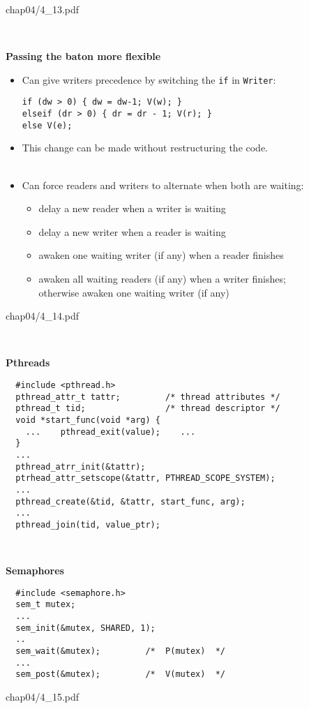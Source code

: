 \documentclass{article}
\newcommand{\myfig}[1]{\begin{overpic}[scale=1.5]{#1}}
\newcommand{\myfigsmall}[1]{\begin{overpic}[scale=1.15]{#1}}
\newcommand{\myfigtiny}[1]{\begin{overpic}[scale=1.0]{#1}}
\newcommand{\myfigend}{\end{overpic}\newpage}
\newcommand{\bi}{\begin{itemize}}
\newcommand{\ii}{\item}
\newcommand{\ei}{\end{itemize}}
\newcommand{\ti}[1]{
\mbox{~}

\vspace{1.25in}
\centerline{\bf #1}}
\begin{document}
\myfigsmall{chap04/4_13.pdf}
\myfigend

\ti{Passing the baton more flexible}
\bi
\ii Can give writers precedence by switching the {\tt if} in {\tt Writer}:
\begin{Verbatim}
if (dw > 0) { dw = dw-1; V(w); }
elseif (dr > 0) { dr = dr - 1; V(r); }
else V(e);
\end{Verbatim}
\ii This change can be made without restructuring the code.
\\\\
\ii Can force readers and writers to alternate when both are waiting:
\bi
\ii delay a new reader when a writer is waiting
\ii delay a new writer when a reader is waiting
\ii awaken one waiting writer (if any) when a reader finishes
\ii awaken all waiting readers (if any) when a writer finishes;\\
 otherwise awaken one waiting writer (if any)
\ei
\ei
\newpage

\myfig{chap04/4_14.pdf}
\myfigend

\ti{Pthreads}

\begin{verbatim}
  #include <pthread.h>
  pthread_attr_t tattr;         /* thread attributes */
  pthread_t tid;                /* thread descriptor */
  void *start_func(void *arg) {
    ...    pthread_exit(value);    ...
  }
  ...
  pthread_atrr_init(&tattr);
  ptrhead_attr_setscope(&tattr, PTHREAD_SCOPE_SYSTEM);
  ...
  pthread_create(&tid, &tattr, start_func, arg);
  ...
  pthread_join(tid, value_ptr);
\end{verbatim}

\newpage

\ti{Semaphores}

\begin{verbatim}
  #include <semaphore.h>
  sem_t mutex;
  ...
  sem_init(&mutex, SHARED, 1);
  ..
  sem_wait(&mutex);         /*  P(mutex)  */
  ...
  sem_post(&mutex);         /*  V(mutex)  */
\end{verbatim}

\myfigtiny{chap04/4_15.pdf}
\myfigend
\end{document}
